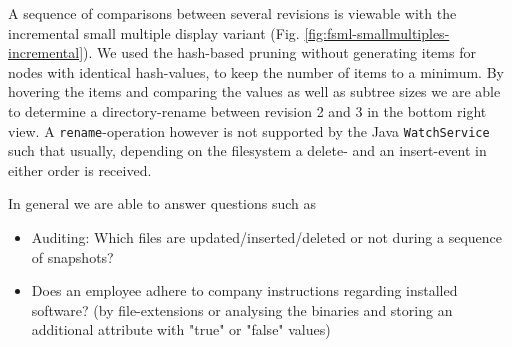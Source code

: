 


A sequence of comparisons between several revisions is viewable with the incremental small multiple display variant (Fig. \ref{fig:fsml-smallmultiples-incremental}). We used the hash-based pruning without generating items for nodes with identical hash-values, to keep the number of items to a minimum. By hovering the items and comparing the values as well as subtree sizes we are able to determine a directory-rename between revision 2 and 3 in the bottom right view. A \texttt{rename}-operation however is not supported by the Java \texttt{WatchService} such that usually, depending on the filesystem a delete- and an insert-event in either order is received.

In general we are able to answer questions such as 

\begin{itemize}
\item Auditing: Which files are updated/inserted/deleted or not during a sequence of snapshots?
\item Does an employee adhere to company instructions regarding installed software? (by file-extensions or analysing the binaries and storing an additional attribute with "true" or "false" values)
\end{itemize}


